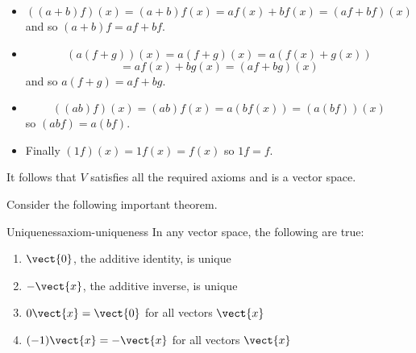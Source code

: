 \begin{solution}
\begin{itemize}
\item
\begin{equation*}
((a+b) f) (x) = (a+b)
f(x) =af(x) +bf(x) = (
af+bf) (x)
\end{equation*}
and so $(a+b) f=af+bf$. 

\item
\begin{equation*}
(a(f+g)) (x) = a(f+g)
(x) = a(f(x) +g(x))
\end{equation*}
\begin{equation*}
=af(x) +bg(x) = (af+bg) (
x)
\end{equation*}
and so $a(f+g) =af+bg$. 

\item
\begin{equation*}
((ab) f) (x) = (ab)
f(x) =a(bf(x)) = (a(
bf)) (x)
\end{equation*}
so $(abf) =a(bf)$. 

\item
Finally $(1f) (
x) = 1f(x) =f(x) $ so $1f=f$.
\end{itemize}

It follows that $V$ satisfies all the required axioms and is a vector space.
\end{solution}

Consider the following important theorem.

\begin{theorem}{Uniqueness}{axiom-uniqueness}
In any vector space, the following are true:
\begin{enumerate}
\item
$\vect{0}$, the additive identity, is unique
\item
$-\vect{x}$, the additive inverse, is unique
\item
$0\vect{x}=\vect{0}$ for all vectors $\vect{x}$
\item
$(-1) \vect{x}=-\vect{x}$ for all vectors $\vect{x}$ 
\end{enumerate}
\end{theorem}

